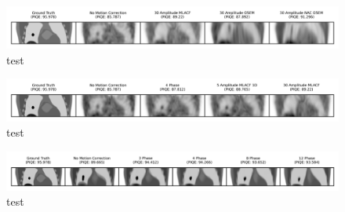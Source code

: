             \begin{figure}
                \centering
                
                \includegraphics[width=1.0\linewidth]{figures/motion_correction_2_results_2_30_amplitude_visual_analysis.png}
                
                \captionsetup{singlelinecheck=false}
                \caption{
                    test
                }
                
                \label{fig:test_30_amplitude_visual_analysis}
            \end{figure}

            \begin{figure}
                \centering
                
                \includegraphics[width=1.0\linewidth]{figures/motion_correction_2_results_2_best_visual_analysis.png}
                
                \captionsetup{singlelinecheck=false}
                \caption{
                    test
                }
                
                \label{fig:test_best_visual_analysis}
            \end{figure}
            
            \begin{figure}
                \centering
                
                \includegraphics[width=1.0\linewidth]{figures/motion_correction_2_results_2_noiseless_phase_visual_analysis.png}
                
                \captionsetup{singlelinecheck=false}
                \caption{
                    test
                }
                
                \label{fig:test_noiseless_phase_visual_analysis}
            \end{figure}

